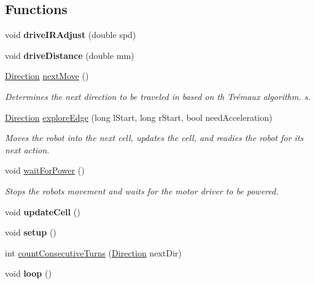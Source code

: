 \subsection*{Functions}
\begin{DoxyCompactItemize}
\item 
\mbox{\label{PCB__test_8ino_ab7aece27431c153f5407864297b7c32b}} 
void {\bfseries drive\+I\+R\+Adjust} (double spd)
\item 
\mbox{\label{PCB__test_8ino_a56dfd95fece10fad4869ceb37cfe035d}} 
void {\bfseries drive\+Distance} (double mm)
\item 
\mbox{\label{PCB__test_8ino_abe60ad2fecd7fb38997addbd92d88c68}} 
\hyperlink{util_8h_a92e22a126ad6bf9d255b517e70d083f6}{Direction} \hyperlink{PCB__test_8ino_abe60ad2fecd7fb38997addbd92d88c68}{next\+Move} ()
\begin{DoxyCompactList}\small\item\em Determines the next direction to be traveled in based on th Trémaux algorithm. s. \end{DoxyCompactList}\item 
\hyperlink{util_8h_a92e22a126ad6bf9d255b517e70d083f6}{Direction} \hyperlink{PCB__test_8ino_abc9fd4d649a1719e3e8f25cf3fd22857}{explore\+Edge} (long l\+Start, long r\+Start, bool need\+Acceleration)
\begin{DoxyCompactList}\small\item\em Moves the robot into the next cell, updates the cell, and readies the robot for its next action. \end{DoxyCompactList}\item 
\mbox{\label{PCB__test_8ino_ad9d79fb25b7ad31450ea631b61f1883e}} 
void \hyperlink{PCB__test_8ino_ad9d79fb25b7ad31450ea631b61f1883e}{wait\+For\+Power} ()
\begin{DoxyCompactList}\small\item\em Stops the robot\textquotesingle{}s movement and waits for the motor driver to be powered. \end{DoxyCompactList}\item 
\mbox{\label{PCB__test_8ino_a25f18de883c5d893238db0b25fb9f471}} 
void {\bfseries update\+Cell} ()
\item 
\mbox{\label{PCB__test_8ino_a4fc01d736fe50cf5b977f755b675f11d}} 
void {\bfseries setup} ()
\item 
int \hyperlink{PCB__test_8ino_a1f32d7057151c1c7f0f16a945a27af1e}{count\+Consecutive\+Turns} (\hyperlink{util_8h_a92e22a126ad6bf9d255b517e70d083f6}{Direction} next\+Dir)
\item 
\mbox{\label{PCB__test_8ino_afe461d27b9c48d5921c00d521181f12f}} 
void {\bfseries loop} ()
\end{DoxyCompactItemize}

